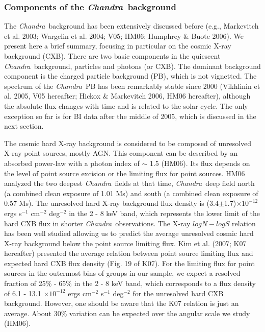 \documentclass{aastex}
\def\chandra    {{\em Chandra}\/}
\begin{document}
\begin{appendix}

\subsubsection{Components of the \chandra\ background}

The \chandra\ background has been extensively discussed before (e.g., Markevitch et al.
2003; Wargelin et al. 2004; V05; HM06; Humphrey \& Buote 2006). We present here
a brief summary, focusing in particular on the cosmic X-ray background (CXB). There are
two basic components in the quiescent \chandra\ background, particles and photons
(or CXB). The dominant background component is the charged particle background
(PB), which is not vignetted. The spectrum of the \chandra\ PB has been remarkably
stable since 2000 (Vikhlinin et al. 2005, V05 hereafter; Hickox \& Markevitch 2006,
HM06 hereafter), although the absolute flux changes with time and is related to
the solar cycle. The only exception so far is for BI data
after the middle of 2005, which is discussed in the next section.

The cosmic hard X-ray background is considered to be composed of unresolved
X-ray point sources, mostly AGN.
This component can be described by an absorbed power-law with a photon index of $\sim$ 1.5
(HM06). Its flux depends on the level of point source excision or the limiting flux
for point sources. HM06 analyzed the two deepest \chandra\ fields at that time,
\chandra\ deep field north (a combined
clean exposure of 1.01 Ms) and south (a combined clean exposure of 0.57 Ms).
The unresolved hard X-ray background flux density is (3.4$\pm$1.7)$\times10^{-12}$ ergs
s$^{-1}$ cm$^{-2}$ deg$^{-2}$ in the 2 - 8 keV band, which represents the lower
limit of the hard CXB flux in shorter \chandra\ observations.
The X-ray $logN - logS$ relation has been well studied allowing us to predict
the average unresolved cosmic hard X-ray background below the point source limiting flux.
Kim et al. (2007; K07 hereafter) presented the average relation between point
source limiting flux and expected hard CXB flux density (Fig. 19 of K07).
For the limiting flux for point sources in the outermost bins of groups in our sample,
we expect a resolved fraction of 25\% - 65\% in the 2 - 8 keV band,
which corresponds to a flux density of 6.1 - 13.1 $\times10^{-12}$ ergs
cm$^{-2}$ s$^{-1}$ deg$^{-2}$ for the unresolved hard CXB background.
However, one should be aware that the K07 relation is just an average. About 30\%
variation can be expected over the angular scale we study (HM06).


\end{appendix}
\end{document}
